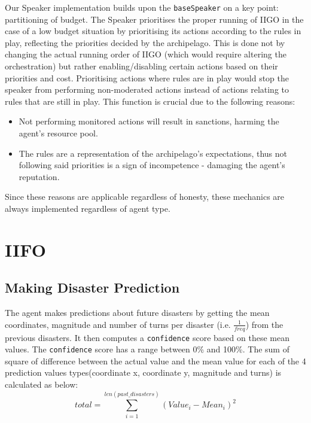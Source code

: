 Our Speaker implementation builds upon the \texttt{baseSpeaker} on a key point: partitioning of budget. The Speaker prioritises the proper running of IIGO in the case of a low budget situation by prioritising its actions according to the rules in play, reflecting the priorities decided by the archipelago. This is done not by changing the actual running order of IIGO (which would require altering the orchestration) but rather enabling/disabling certain actions based on their priorities and cost. Prioritising actions where rules are in play would stop the speaker from performing non-moderated actions instead of actions relating to rules that are still in play. This function is crucial due to the following reasons:
\begin{itemize}
    \item Not performing monitored actions will result in sanctions, harming the agent's resource pool.
    \item The rules are a representation of the archipelago's expectations, thus not following said priorities is a sign of incompetence - damaging the agent's reputation.
\end{itemize}
Since these reasons are applicable regardless of honesty, these mechanics are always implemented regardless of agent type.

\section{IIFO}\label{sec:IIFO}

\subsection{Making Disaster Prediction}
The agent makes predictions about future disasters by getting the mean coordinates, magnitude and number of turns per disaster (i.e. $\frac{1}{freq}$) from the previous disasters. It then computes a \texttt{confidence} score based on these mean values. The \texttt{confidence} score has a range between 0\% and 100\%. The sum of square of difference between the actual value and the mean value for each of the 4 prediction values types(coordinate x, coordinate y, magnitude and turns) is calculated as below:
\begin{equation}
    total = \sum_{i=1}^{len(past\_disasters)}(Value_i - Mean_i)^2
\end{equation}

